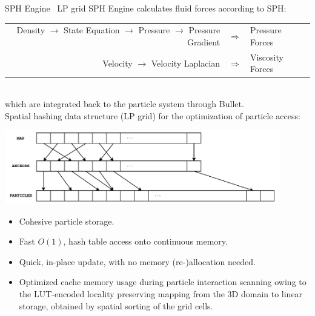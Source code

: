 \documentclass[8pt,sans,mathserif,aspectratio=43]{beamer}
\begin{document}
\begin{frame}{SPH Engine \textendash\ LP grid}
  SPH Engine calculates fluid forces according to SPH:\\ \vspace{5pt}
  \begin{tabular}{rll}
    Density $\rightarrow$ State Equation $\rightarrow$ Pressure $\rightarrow$
    Pressure Gradient & $\Rightarrow$ & Pressure Forces\\
    Velocity $\rightarrow$ Velocity Laplacian & $\Rightarrow$ & Viscosity Forces\\
  \end{tabular}\\ \vspace{5pt}
  which are integrated back to the particle system through Bullet.\\\pause
  \vspace{5pt}
  Spatial hashing data structure (LP grid) for the optimization of particle
  access:
  \begin{center}
    \includegraphics[width=0.9\textwidth]{figures/lp-grid.pdf}
  \end{center}\pause
  \begin{itemize}
  \item Cohesive particle storage.\pause
  \item Fast $O(1)$, hash table access onto continuous memory.\pause
  \item Quick, in-place update, with no memory (re-)allocation needed.\pause
  \item Optimized cache memory usage during particle interaction scanning owing
    to the LUT-encoded locality preserving mapping from the 3D domain to linear
    storage, obtained by spatial sorting of the grid cells.
  \end{itemize}
\end{frame}

\end{document}
